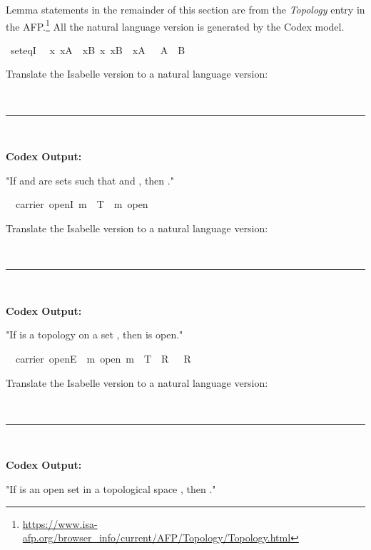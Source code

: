 \documentclass{article}
\begin{document}
Lemma statements in the remainder of this section are from the \emph{Topology} entry in the AFP.\footnote{\url{https://www.isa-afp.org/browser_info/current/AFP/Topology/Topology.html}} All the natural language version is generated by the Codex model.

\begin{boxB}
\begin{isabelle}
\isamarkupfalse \ seteqI{\isacharcolon}{\kern0pt}\isanewline
\ \ {\isachardoublequoteopen}{\isasymlbrakk}{\isasymAnd}x{\isachardot}{\kern0pt}\ x{\isasymin}A\ {\isasymLongrightarrow}\ x{\isasymin}B{\isacharsemicolon}{\kern0pt}\ {\isasymAnd}x{\isachardot}{\kern0pt}\ x{\isasymin}B\ {\isasymLongrightarrow}\ x{\isasymin}A\ {\isasymrbrakk}\ {\isasymLongrightarrow}\ A\ {\isacharequal}{\kern0pt}\ B{\isachardoublequoteclose}
\end{isabelle}
Translate the Isabelle version to a natural language version:

\
\hrule
\

\textbf{Codex Output:}

"If  and  are sets such that  and , then ."
\end{boxB}

\begin{boxB}
\begin{isabelle}
\isamarkupfalse \ {\isacharparenleft}{\kern0pt}\ carrier{\isacharparenright}{\kern0pt}\ openI{\isacharcolon}{\kern0pt}\ {\isachardoublequoteopen}m\ {\isasymin}\ T\ {\isasymLongrightarrow}\ m\ open{\isachardoublequoteclose}
\end{isabelle}
Translate the Isabelle version to a natural language version:

\
\hrule
\

\textbf{Codex Output:}

"If  is a topology on a set , then  is open."
\end{boxB}

\begin{boxB}
\begin{isabelle}
\isacommand{lemma}\isamarkupfalse \ {\isacharparenleft}{\kern0pt}\isakeyword{in}\ carrier{\isacharparenright}{\kern0pt}\ openE{\isacharcolon}{\kern0pt}\ {\isachardoublequoteopen}{\isasymlbrakk}\ m\ open{\isacharsemicolon}{\kern0pt}\ m\ {\isasymin}\ T\ {\isasymLongrightarrow}\ R\ {\isasymrbrakk}\ {\isasymLongrightarrow}\ R{\isachardoublequoteclose}
\end{isabelle}
Translate the Isabelle version to a natural language version:

\
\hrule
\

\textbf{Codex Output:}

"If  is an open set in a topological space , then ."
\end{boxB}
\end{document}
